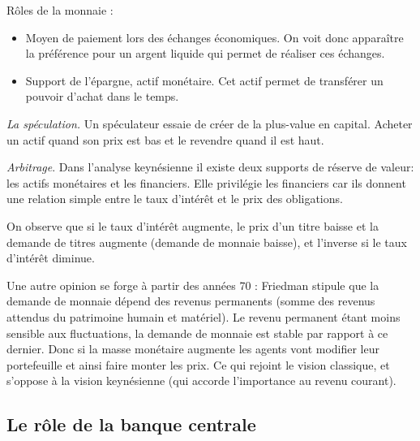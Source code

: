 \begin{tcolorbox}[title=La demande de monnaie dans une économie keynésienne simplifiée]
	Rôles de la monnaie : 
	\begin{itemize}
		\item Moyen de paiement lors des échanges économiques. On voit donc apparaître la préférence pour un argent liquide qui permet de réaliser ces échanges.
		\item Support de l'épargne, actif monétaire. Cet actif permet de transférer un pouvoir d'achat dans le temps.
	\end{itemize}

\emph{La spéculation.} Un spéculateur essaie de créer de la plus-value en capital. Acheter un actif quand son prix est bas et le revendre quand il est haut.

\emph{Arbitrage}. Dans l'analyse keynésienne il existe deux supports de réserve de valeur: les actifs monétaires et les financiers. Elle privilégie les 
financiers car ils donnent une relation simple entre le taux d'intérêt et le prix des obligations. 

On observe que si le taux d'intérêt augmente, le prix d'un titre baisse et la demande de titres augmente (demande de monnaie baisse), et l'inverse si le taux
d'intérêt diminue.
	
\end{tcolorbox}

Une autre opinion se forge à partir des années 70 : Friedman stipule que la demande de monnaie dépend des revenus permanents (somme des revenus attendus du 
patrimoine humain et matériel). Le revenu permanent étant moins sensible aux fluctuations, la demande de monnaie est stable par rapport à ce dernier. 
Donc si la masse monétaire augmente les agents vont modifier leur portefeuille et ainsi faire monter les prix. Ce qui rejoint le vision classique, et 
s'oppose à la vision keynésienne (qui accorde l'importance au revenu courant).





\subsection{Le rôle de la banque centrale} %
\label{sec:le_role_de_la_banque_centrale}

